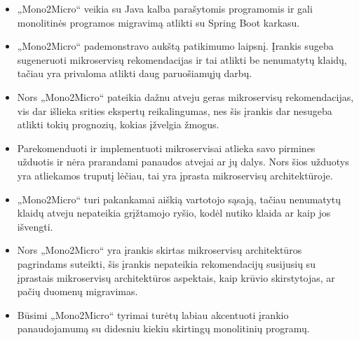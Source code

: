 \documentclass{VUMIFPSbakalaurinis}
\begin{document}
\begin{itemize}
    \item „Mono2Micro“ veikia su Java kalba parašytomis programomis ir gali monolitinės programos migravimą atlikti su Spring Boot karkasu.

    \item „Mono2Micro“ pademonstravo aukštą patikimumo laipsnį. Įrankis sugeba sugeneruoti mikroservisų rekomendacijas ir tai atlikti be nenumatytų klaidų, tačiau yra privaloma atlikti daug paruošiamųjų darbų.

    \item Nors „Mono2Micro“ pateikia dažnu atveju geras mikroservisų rekomendacijas, vis dar išlieka srities ekspertų reikalingumas, nes šis įrankis dar nesugeba atlikti tokių prognozių, kokias įžvelgia žmogus.

    \item Parekomenduoti ir implementuoti mikroservisai atlieka savo pirmines užduotis ir nėra prarandami panaudos atvejai ar jų dalys. Nors šios užduotys yra atliekamos truputį lėčiau, tai yra įprasta mikroservisų architektūroje.

    \item „Mono2Micro“ turi pakankamai aiškią vartotojo sąsają, tačiau nenumatytų klaidų atveju nepateikia grįžtamojo ryšio, kodėl nutiko klaida ar kaip jos išvengti.

    \item Nors „Mono2Micro“ yra įrankis skirtas mikroservisų architektūros pagrindams suteikti, šis įrankis nepateikia rekomendacijų susijusių su įprastais mikroservisų architektūros aspektais, kaip krūvio skirstytojas, ar pačių duomenų migravimas.

    \item Būsimi „Mono2Micro“ tyrimai turėtų labiau akcentuoti įrankio panaudojamumą su didesniu kiekiu skirtingų monolitinių programų.

\end{itemize}

\printbibliography[heading=bibintoc]

\appendix  %

\end{document}
